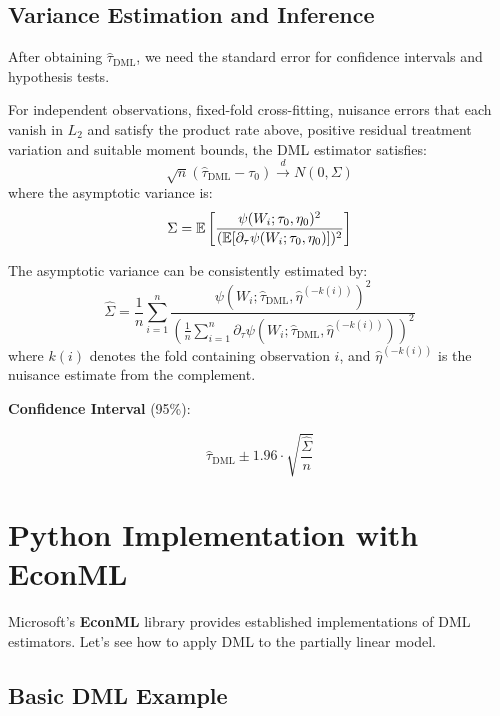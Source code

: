 \subsection{Variance Estimation and
Inference}\label{_variance_estimation_and_inference}

After obtaining $\hat{\tau}_{\text{DML}}$, we need the standard error
for confidence intervals and hypothesis tests.

\begin{theorem}
\label{thm:dml_asymptotic_normality}
%
For independent observations, fixed-fold cross-fitting, nuisance errors that each vanish in \(L_2\) and satisfy the product rate above, positive residual treatment variation and suitable moment bounds, the
DML estimator satisfies:
\[\sqrt{n}(\hat{\tau}_{\text{DML}} - \tau_0) \xrightarrow{d} N(0, \Sigma)\]
where the asymptotic variance is:
\[\Sigma = \mathbb{E}\left[\frac{\psi(W_i; \tau_0, \eta_0)^2}{(\mathbb{E}[\partial_\tau \psi(W_i; \tau_0, \eta_0)])^2}\right]\]
\end{theorem}

\begin{remark}
The asymptotic variance can be consistently estimated by:
\[\hat{\Sigma} = \frac{1}{n} \sum_{i=1}^n \frac{\psi(W_i; \hat{\tau}_{\text{DML}}, \hat{\eta}^{(-k(i))})^2}{\left(\frac{1}{n}\sum_{i=1}^n \partial_\tau \psi(W_i; \hat{\tau}_{\text{DML}}, \hat{\eta}^{(-k(i))})\right)^2}\]
where $k(i)$ denotes the fold containing observation $i$, and
$\hat{\eta}^{(-k(i))}$ is the nuisance estimate from the complement.
\end{remark}

\textbf{Confidence Interval} (95\%):

\[\hat{\tau}_{\text{DML}} \pm 1.96 \cdot \sqrt{\frac{\hat{\Sigma}}{n}}\]

\section{Python Implementation with
EconML}\label{_python_implementation_with_econml}

Microsoft's \textbf{EconML} library provides established
implementations of DML estimators. Let's see how to apply DML to the
partially linear model.

\subsection{Basic DML Example}\label{_basic_dml_example}

